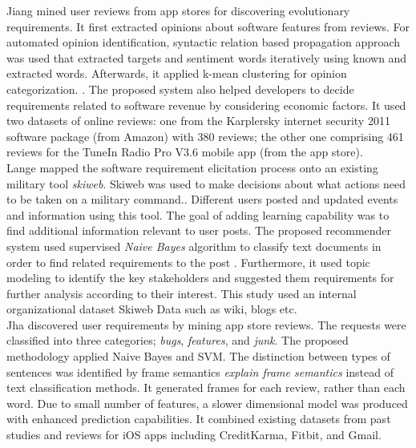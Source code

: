 Jiang \etal \cite{Jiang:2014} mined user reviews from 
app stores for discovering evolutionary requirements. It first extracted opinions about software features from reviews. For automated opinion identification, syntactic
relation based propagation approach was used that extracted targets and sentiment words
iteratively using known and extracted words. Afterwards, it applied k-mean clustering for opinion categorization.
. The proposed system also helped developers to decide requirements related to software revenue by considering economic factors.  It used two datasets of online reviews: one from the
Karplersky internet security 2011 software package (from Amazon) with 380
reviews; the other one  comprising 461 reviews for the  TuneIn Radio Pro V3.6
mobile app (from the app store).\\

Lange \etal\cite{Douglas:S2008} mapped the software requirement elicitation
process onto an existing military tool \emph{skiweb}. Skiweb was used to make decisions about what actions need to be taken on a military command.. Different users posted and updated events and information using this tool. The goal of adding learning capability was to find additional information relevant to user posts. The proposed recommender system used supervised
\emph{Naive Bayes} algorithm to classify text documents in order to find related
requirements to the post . Furthermore, it
 used topic modeling to identify the key
stakeholders and suggested them requirements for further analysis according to their interest. This study used an internal organizational
dataset Skiweb Data such as wiki, blogs etc.\\

Jha \etal \cite{Jha:2017} discovered user requirements by mining app store reviews. The requests were classified into three categories;
\emph{bugs}, \emph{features}, and \emph{junk}. The proposed methodology applied Naive Bayes and SVM. The distinction between types of sentences was identified by frame semantics \emph{explain frame semantics} instead of text classification methods. It generated frames for each review, rather than each word. Due to small number of features, a slower dimensional model was produced with enhanced prediction capabilities. It combined existing
datasets from past studies and reviews for iOS apps including CreditKarma,
Fitbit, and Gmail.

